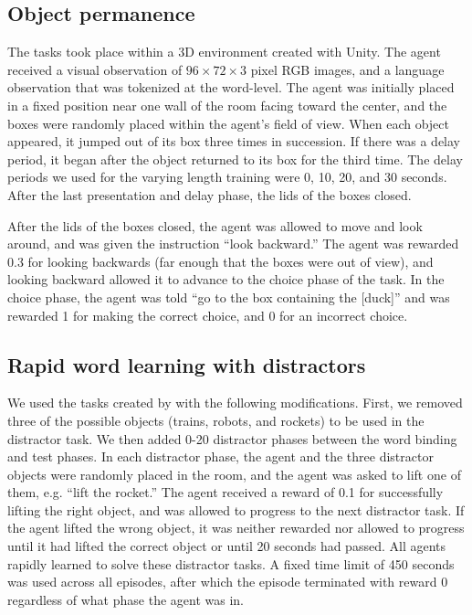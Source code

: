 \subsection{Object permanence}
The tasks took place within a 3D environment created with Unity. The agent received a visual observation of \(96 \times 72 \times 3\) pixel RGB images, and a language observation that was tokenized at the word-level. The agent was initially placed in a fixed position near one wall of the room facing toward the center, and the boxes were randomly placed within the agent's field of view. When each object appeared, it jumped out of its box three times in succession. If there was a delay period, it began after the object returned to its box for the third time. The delay periods we used for the varying length training were 0, 10, 20, and 30 seconds. After the last presentation and delay phase, the lids of the boxes closed.

After the lids of the boxes closed, the agent was allowed to move and look around, and was given the instruction ``look backward.'' The agent was rewarded 0.3 for looking backwards (far enough that the boxes were out of view), and looking backward allowed it to advance to the choice phase of the task. In the choice phase, the agent was told ``go to the box containing the [duck]'' and was rewarded 1 for making the correct choice, and 0 for an incorrect choice.

\subsection{Rapid word learning with distractors}
We used the tasks created by \citet{hill2020grounded} with the following modifications. First, we removed three of the possible objects (trains, robots, and rockets) to be used in the distractor task. We then added 0-20 distractor phases between the word binding and test phases. In each distractor phase, the agent and the three distractor objects were randomly placed in the room, and the agent was asked to lift one of them, e.g. ``lift the rocket.'' The agent received a reward of 0.1 for successfully lifting the right object, and was allowed to progress to the next distractor task. If the agent lifted the wrong object, it was neither rewarded nor allowed to progress until it had lifted the correct object or until 20 seconds had passed. All agents rapidly learned to solve these distractor tasks. A fixed time limit of 450 seconds was used across all episodes, after which the episode terminated with reward 0 regardless of what phase the agent was in. 

